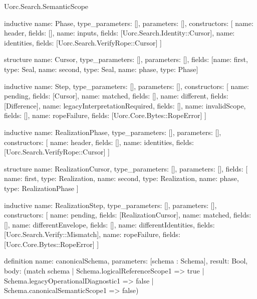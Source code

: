 \begin{lexlean}{Uorc.Search.SemanticScope}
\begin{semanticmodule}
inductive{
  name: Phase,
  type_parameters: [],
  parameters: [],
  constructors: [
    {name: header, fields: []},
    {name: inputs, fields: [Uorc.Search.Identity::Cursor]},
    {name: identities, fields: [Uorc.Search.VerifyRope::Cursor]}
  ]
}

structure{
  name: Cursor,
  type_parameters: [],
  parameters: [],
  fields: [{name: first, type: Seal}, {name: second, type: Seal}, {name: phase, type: Phase}]
}

inductive{
  name: Step,
  type_parameters: [],
  parameters: [],
  constructors: [
    {name: pending, fields: [Cursor]},
    {name: matched, fields: []},
    {name: different, fields: [Difference]},
    {name: legacyInterpretationRequired, fields: []},
    {name: invalidScope, fields: []},
    {name: ropeFailure, fields: [Uorc.Core.Bytes::RopeError]}
  ]
}

inductive{
  name: RealizationPhase,
  type_parameters: [],
  parameters: [],
  constructors: [
    {name: header, fields: []},
    {name: identities, fields: [Uorc.Search.VerifyRope::Cursor]}
  ]
}

structure{
  name: RealizationCursor,
  type_parameters: [],
  parameters: [],
  fields: [
    {name: first, type: Realization},
    {name: second, type: Realization},
    {name: phase, type: RealizationPhase}
  ]
}

inductive{
  name: RealizationStep,
  type_parameters: [],
  parameters: [],
  constructors: [
    {name: pending, fields: [RealizationCursor]},
    {name: matched, fields: []},
    {name: differentEnvelope, fields: []},
    {name: differentIdentities, fields: [Uorc.Search.Verify::Mismatch]},
    {name: ropeFailure, fields: [Uorc.Core.Bytes::RopeError]}
  ]
}

definition{
  name: canonicalSchema,
  parameters: [schema : Schema],
  result: Bool,
  body: (match schema
    | Schema.logicalReferenceScope1 => true
    | Schema.legacyOperationalDiagnostic1 => false
    | Schema.canonicalSemanticScope1 => false)
}


\end{semanticmodule}
\end{lexlean}
